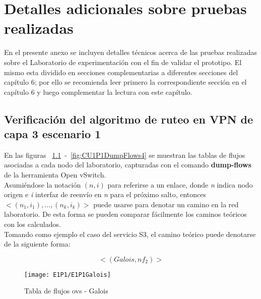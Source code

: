 
\chapter{Detalles adicionales sobre pruebas realizadas}
\label{appendix6}

\ifpdf
    \graphicspath{{Appendix6/Figs/Raster/}{Appendix6/Figs/PDF/}{Appendix6/Figs/}}
\else
    \graphicspath{{Appendix6/Figs/Vector/}{Appendix6/Figs/}}
\fi

En el presente anexo se incluyen detalles t\'ecnicos acerca de las pruebas realizadas sobre el Laboratorio de experimentaci\'on con el fin de validar el prototipo. El mismo esta dividido en secciones complementarias a diferentes secciones del cap\'itulo 6; por ello se recomienda leer primero la correspondiente secci\'on en el cap\'itulo 6 y luego complementar la lectura con este cap\'itulo.

\section{Verificación del algoritmo de ruteo en VPN de capa 3 escenario 1}
\label{appendix6.1}
En las figuras ~\ref{fig:CU1P1DumpFlows1}~-~\ref{fig:CU1P1DumpFlows4} se muestran las tablas de flujos asociadas a cada nodo del laboratorio, capturadas con el comando \textbf{dump-flows} de la herramienta Open vSwitch.\\

Asumiéndose la notaci\'on $(n, i)$ para referirse a un enlace, donde \textit{n} indica nodo origen e \textit{i} interfaz de reenvío en \textit{n} para el próximo salto, entonces $<(n_1, i_1), \dots, (n_k, i_k)>$ puede usarse para denotar un camino en la red laboratorio. De esta forma se pueden comparar f\'acilmente los caminos te\'oricos con los calculados.\\

Tomando como ejemplo el caso del servicio S3, el camino te\'orico puede denotarse de la siguiente forma:
 
$$<(Galois, nf_2)>$$

\newpage
\begin{figure}[ht!] 
\centering    
\texttt{[image: E1P1/E1P1Galois]}
\caption[Tabla de flujos ovs - Galois]{Tabla de flujos ovs - Galois}
\label{fig:CU1P1DumpFlows1}
\end{figure}

